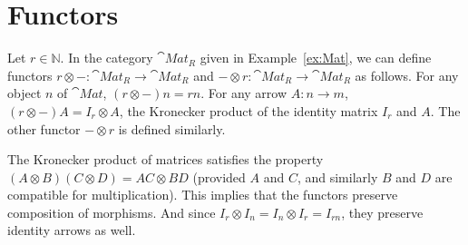 \chapter{Functors}\label{chap:Functors}
\begin{Example}\label{ex:MatFuncs}
Let $r \in \mathbb N$. In the category $\cat{Mat}_R$ given in Example~\ref{ex:Mat}, we can define functors $r \otimes - \colon \cat{Mat}_R \to \cat{Mat}_R$ and $- \otimes r \colon \cat{Mat}_R \to \cat{Mat}_R$ as follows. For any object $n$ of $\cat{Mat}$, $(r \otimes -) n = rn$. For any arrow $A \colon n \to m$, $(r \otimes -) A = I_r \otimes A$, the Kronecker product of the identity matrix $I_r$ and $A$. The other functor $- \otimes r$ is defined similarly.

The Kronecker product of matrices satisfies the property $(A \otimes B)(C \otimes D) = AC \otimes BD$ (provided $A$ and $C$, and similarly $B$ and $D$ are compatible for multiplication). This implies that the functors preserve composition of morphisms. And since $I_r \otimes I_n = I_n \otimes I_r = I_{rn}$, they preserve identity arrows as well.
\end{Example}
